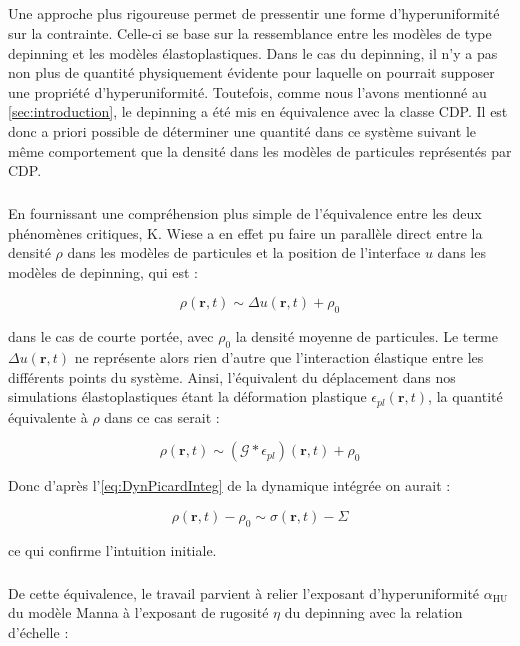 \subparagraph{}Une approche plus rigoureuse permet de pressentir une forme d'hyperuniformité sur la contrainte. Celle-ci se base sur la ressemblance entre les modèles de type depinning et les modèles élastoplastiques. Dans le cas du depinning, il n'y a pas non plus de quantité physiquement évidente pour laquelle on pourrait supposer une propriété d'hyperuniformité. Toutefois, comme nous l'avons mentionné au \autoref{sec:introduction}, le depinning a été mis en équivalence avec la classe CDP. Il est donc a priori possible de déterminer une quantité dans ce système suivant le même comportement que la densité dans les modèles de particules représentés par CDP. 

\subparagraph{}En fournissant une compréhension plus simple de l'équivalence entre les deux phénomènes critiques, K. Wiese \cite{wiese_hyperuniformity_2024} a en effet pu faire un parallèle direct entre la densité $\rho$ dans les modèles de particules et la position de l'interface $u$ dans les modèles de depinning, qui est :

\begin{equation}
	\rho(\mathbf{r},t) \sim \Delta u(\mathbf{r},t) + \rho_0
\end{equation}

\noindent dans le cas de courte portée, avec $\rho_0$ la densité moyenne de particules. Le terme $\Delta u(\mathbf{r},t)$ ne représente alors rien d'autre que l'interaction élastique entre les différents points du système. Ainsi, l'équivalent du déplacement dans nos simulations élastoplastiques étant la déformation plastique $
\epsilon_{pl}(\mathbf{r},t)$, la quantité équivalente à $\rho$ dans ce cas serait :

\begin{equation}
	\rho (\mathbf{r},t) \sim \left(\mathcal{G}\ast\epsilon_{pl}\right)(\mathbf{r},t)+ \rho_0
\end{equation}

\noindent Donc d'après l'\autoref{eq:DynPicardInteg} de la dynamique intégrée on aurait :

\begin{equation}
	\rho (\mathbf{r},t) - \rho_0 \sim \sigma (\mathbf{r},t)- \Sigma
\end{equation}

\noindent ce qui confirme l'intuition initiale.

\subparagraph{}De cette équivalence, le travail \cite{wiese_hyperuniformity_2024} parvient à relier l'exposant d'hyperuniformité $\alpha_\text{HU}$ du modèle Manna à l'exposant de rugosité $\eta$ du depinning avec la relation d'échelle :

